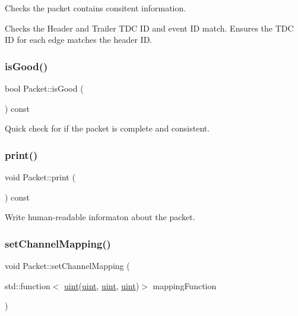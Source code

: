 Checks the packet contains consitent information. 

Checks the Header and Trailer T\+DC ID and event ID match. Ensures the T\+DC ID for each edge matches the header ID. \mbox{\label{class_packet_ae70511a50e1f186b8a3369ee6ab8589c}} 
\subsubsection{\texorpdfstring{is\+Good()}{isGood()}}
{\footnotesize\ttfamily bool Packet\+::is\+Good (\begin{DoxyParamCaption}{ }\end{DoxyParamCaption}) const\hspace{0.3cm}{\ttfamily [inline]}}



Quick check for if the packet is complete and consistent. 

\mbox{\label{class_packet_aec87fc2f2473111a694ad8b6f60e7666}} 
\subsubsection{\texorpdfstring{print()}{print()}}
{\footnotesize\ttfamily void Packet\+::print (\begin{DoxyParamCaption}{ }\end{DoxyParamCaption}) const}



Write human-\/readable informaton about the packet. 

\mbox{\label{class_packet_aab292dda74224f53a94d005f49a1c3a8}} 
\subsubsection{\texorpdfstring{set\+Channel\+Mapping()}{setChannelMapping()}}
{\footnotesize\ttfamily void Packet\+::set\+Channel\+Mapping (\begin{DoxyParamCaption}\item[{std\+::function$<$ \hyperlink{_channel_mappings_8cpp_a69aa29b598b851b0640aa225a9e5d61d}{uint}(\hyperlink{_channel_mappings_8cpp_a69aa29b598b851b0640aa225a9e5d61d}{uint}, \hyperlink{_channel_mappings_8cpp_a69aa29b598b851b0640aa225a9e5d61d}{uint}, \hyperlink{_channel_mappings_8cpp_a69aa29b598b851b0640aa225a9e5d61d}{uint})$>$}]{mapping\+Function }\end{DoxyParamCaption})\hspace{0.3cm}{\ttfamily [static]}}



